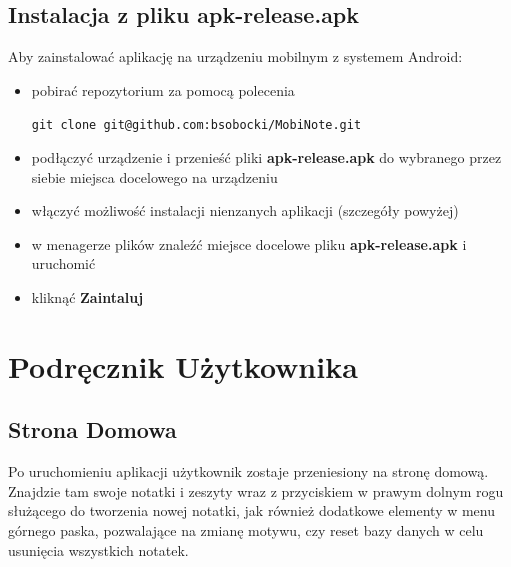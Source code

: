 \documentclass[shortabstract]{iithesis}
\begin{document}
\section{Instalacja z pliku apk-release.apk}
Aby zainstalować aplikację na urządzeniu mobilnym z systemem Android:

\begin{itemize}
    \item pobirać repozytorium za pomocą polecenia

    \verb|git clone git@github.com:bsobocki/MobiNote.git|
    \item podłączyć urządzenie i przenieść pliki \textbf{apk-release.apk} do wybranego przez siebie miejsca docelowego na urządzeniu
    \item włączyć możliwość instalacji nienzanych aplikacji (szczegóły powyżej)
    \item w menagerze plików znaleźć miejsce docelowe pliku \textbf{apk-release.apk} i uruchomić
    \item kliknąć \textbf{Zaintaluj}
\end{itemize}

\chapter{Podręcznik Użytkownika}

\section{Strona Domowa}

Po uruchomieniu aplikacji użytkownik zostaje przeniesiony na stronę domową. Znajdzie tam swoje notatki i zeszyty wraz z przyciskiem w prawym dolnym rogu służącego do tworzenia nowej notatki, jak również dodatkowe elementy w menu górnego paska, pozwalające na zmianę motywu, czy reset bazy danych w celu usunięcia wszystkich notatek. 
\end{document}
